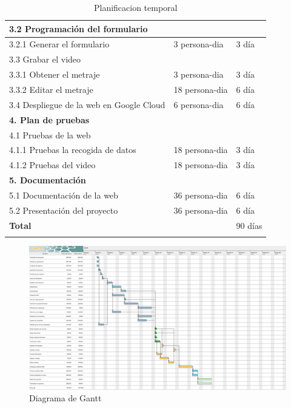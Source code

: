 \documentclass{report}
\begin{document}
\begin{center}
\begin{longtable}{|p{7cm}|p{3cm}|p{3cm}|}
                \hline
                3.2 Programación del formulario\\
                \hline
                3.2.1 Generar el formulario & 3 persona-dia & 3 día\\
                \hline
                3.3 Grabar el video\\
                \hline
                3.3.1 Obtener el metraje & 3 persona-dia & 3 día\\
                \hline
                3.3.2 Editar el metraje & 18 persona-dia & 6 día\\
                \hline
                3.4 Despliegue de la web en Google Cloud & 6 persona-dia & 6 día\\
                \hline
                \textbf{4. Plan de pruebas} &  & \\
                \hline
                4.1 Pruebas de la web & & \\
                \hline
                4.1.1 Pruebas la recogida de datos & 18 persona-dia & 3 día\\
                \hline
                4.1.2 Pruebas del video & 18 persona-dia & 3 día\\
                \hline
                \textbf{5. Documentación} &  & \\
                \hline
                5.1 Documentación de la web & 36 persona-dia & 6 día\\
                \hline
                5.2 Presentación del proyecto & 36 persona-dia & 6 día\\
                \hline
                \hline
                \textbf{Total} &  & 90 días\\
                \hline
                \caption{Planificacion temporal}
            \end{longtable}
            \begin{figure}[H]
                \centering
                \includegraphics[width=1\textwidth]{./img/gantt.png}
                \caption{Diagrama de Gantt}
            \end{figure}
        \end{center}
\end{document}
